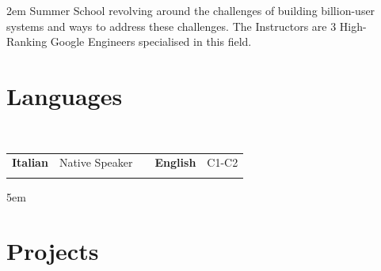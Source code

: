 \documentclass{clean_cv}
\begin{document}
\begin{datetabular}{2em}
{Summer School revolving around the challenges of building billion-user systems and ways to address these challenges. The Instructors are 3 High-Ranking Google Engineers specialised in this field. 
}



\end{datetabular}

\section{Languages}

\begin{center}\\[7px]
\begin{tabular}{lllll}
\textbf{Italian}  & Native Speaker & \quad\quad\quad\quad\quad\quad\quad\quad\quad\quad\quad &
\textbf{English}  & C1-C2           \\
\\
\end{tabular}
\end{center}

\eatvspace

\begin{datetabular}{5em}

\end{datetabular}


\section{Projects}
\end{document}
